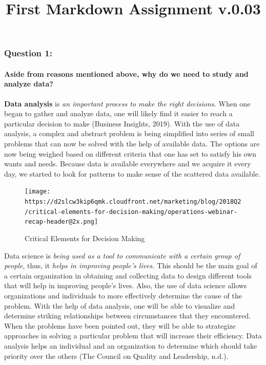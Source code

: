 \documentclass[
]{article}
\title{First Markdown Assignment v.0.03}
\author{}
\date{\vspace{-2.5em}}
\begin{document}
\maketitle

\hypertarget{question-1}{%
\subsubsection{\texorpdfstring{\textbf{Question
1:}}{Question 1:}}\label{question-1}}

\hypertarget{aside-from-reasons-mentioned-above-why-do-we-need-to-study-and-analyze-data}{%
\paragraph{Aside from reasons mentioned above, why do we need to study
and analyze
data?}\label{aside-from-reasons-mentioned-above-why-do-we-need-to-study-and-analyze-data}}

\textbf{Data analysis} is \emph{an important process to make the right
decisions.} When one began to gather and analyze data, one will likely
find it easier to reach a particular decision to make (Business
Insights, 2019). With the use of data analysis, a complex and abstract
problem is being simplified into series of small problems that can now
be solved with the help of available data. The options are now being
weighed based on different criteria that one has set to satisfy his own
wants and needs. Because data is available everywhere and we acquire it
every day, we started to look for patterns to make sense of the
scattered data available.

\begin{figure}
\centering
\texttt{[image: https://d2slcw3kip6qmk.cloudfront.net/marketing/blog/2018Q2/critical-elements-for-decision-making/operations-webinar-recap-header@2x.png]}
\caption{Critical Elements for Decision Making}
\end{figure}

Data science is \emph{being used as a tool to communicate with a certain
group of people}, thus, it \emph{helps in improving people's lives.}
This should be the main goal of a certain organization in obtaining and
collecting data to design different tools that will help in improving
people's lives. Also, the use of data science allows organizations and
individuals to more effectively determine the cause of the problem. With
the help of data analysis, one will be able to visualize and determine
striking relationships between circumstances that they encountered. When
the problems have been pointed out, they will be able to strategize
approaches in solving a particular problem that will increase their
efficiency. Data analysis helps an individual and an organization to
determine which should take priority over the others (The Council on
Quality and Leadership, n.d.).
\end{document}
